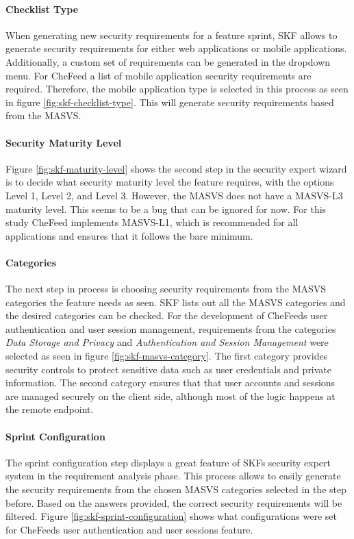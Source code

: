 \paragraph{Checklist Type}
When generating new security requirements for a feature sprint, SKF allows to generate security requirements for either web applications or mobile applications. Additionally, a custom set of requirements can be generated in the dropdown menu. For CheFeed a list of mobile application security requirements are required. Therefore, the mobile application type is selected in this process as seen in figure \ref{fig:skf-checklist-type}. This will generate security requirements based from the MASVS.

\paragraph{Security Maturity Level}
Figure \ref{fig:skf-maturity-level} shows the second step in the security expert wizard is to decide what security maturity level the feature requires, with the options Level 1, Level 2, and Level 3. However, the MASVS does not have a MASVS-L3 maturity level. This seems to be a bug that can be ignored for now. For this study CheFeed implements MASVS-L1, which is recommended for all applications and ensures that it follows the bare minimum.

\paragraph{Categories}
The next step in process is choosing security requirements from the MASVS categories the feature needs as seen. SKF lists out all the MASVS categories and the desired categories can be checked. For the development of CheFeeds user authentication and user session management, requirements from the categories \emph{Data Storage and Privacy} and \emph{Authentication and Session Management} were selected as seen in figure \ref{fig:skf-masvs-category}. The first category provides security controls to protect sensitive data such as user credentials and private information. The second category ensures that that user accounts and sessions are managed securely on the client side, although most of the logic happens at the remote endpoint.

\paragraph{Sprint Configuration}
The sprint configuration step displays a great feature of SKFs security expert system in the requirement analysis phase. This process allows to easily generate the security requirements from the chosen MASVS categories selected in the step before. Based on the answers provided, the correct security requirements will be filtered. Figure \ref{fig:skf-sprint-configuration} shows what configurations were set for CheFeeds user authentication and user sessions feature.

